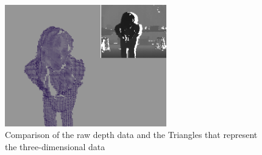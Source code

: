 \documentclass[pdftex,10.5pt]{report}
\begin{document}
\begin{figure}[H]
	\centering
	\includegraphics[width=70mm]{figures/cadyholdingball2.png}
	\caption{Comparison of the raw depth data and the Triangles that represent the three-dimensional data}
	\label{balls2}
\end{figure}
\end{document}
